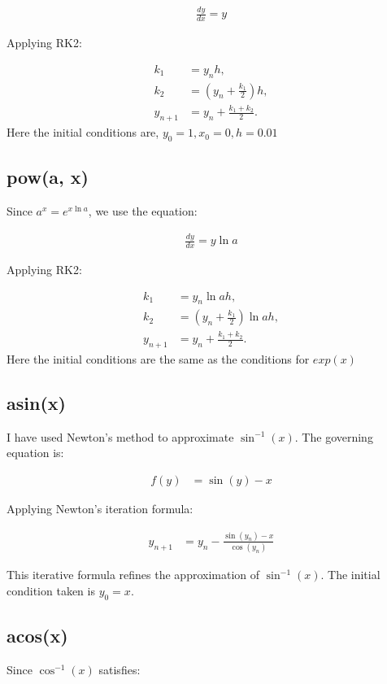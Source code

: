\documentclass[journal]{IEEEtran}
\begin{document}
\begin{align}
	\frac{dy}{dx} = y
\end{align}

Applying RK2:

\begin{align}
	k_1 &= y_n h, \\
	k_2 &= (y_n + \frac{k_1}{2})h, \\
	y_{n+1} &= y_n +\frac{k_1 + k_2}{2}.
\end{align}
Here the initial conditions are, $y_0 = 1, x_0 = 0, h = 0.01$

\subsection{pow(a, x)}
Since \( a^x = e^{x \ln a} \), we use the equation:

\begin{align}
	\frac{dy}{dx} = y \ln a
\end{align}

Applying RK2:

\begin{align}
	k_1 &= y_n \ln a h, \\
	k_2 &= (y_n + \frac{k_1}{2}) \ln a h, \\
	y_{n+1} &= y_n + \frac{k_1 + k_2}{2}.
\end{align}
Here the initial conditions are the same as the conditions for $exp(x)$
\subsection{asin(x)}
I have used Newton’s method to approximate \(\sin^{-1}(x)\). The governing equation is:

\begin{align}
	f(y) &= \sin(y) - x
\end{align}

Applying Newton’s iteration formula:

\begin{align}
	y_{n+1} &= y_n - \frac{\sin(y_n) - x}{\cos(y_n)}
\end{align}

This iterative formula refines the approximation of \(\sin^{-1}(x)\). The initial condition taken is $y_0  =x$.

\subsection{acos(x)}
Since \(\cos^{-1}(x)\) satisfies:
\end{document}
